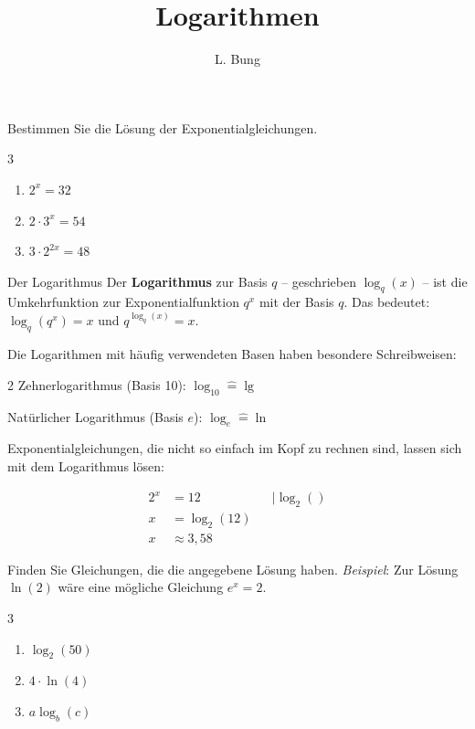 \documentclass[11pt, a4paper, oneside]{article}
\begin{document}
	\author{L. Bung}
	\title{Logarithmen}
	\subject{Mathematik}
	\maketitle
	
	
	Bestimmen Sie die Lösung der Exponentialgleichungen.
	
	\begin{multicols}{3}
		\begin{enumerate}[label=\alph*)]
			\item $2^x=32$
			\item $2\cdot3^x=54$
			\item $3\cdot2^{2x}=48$
		\end{enumerate}
	\end{multicols}
	
	\checkered[6cm]
	
	\begin{hint}{Der Logarithmus}
		Der \textbf{Logarithmus} zur Basis $q$ -- geschrieben $\log_q(x)$ -- ist die Umkehrfunktion zur Exponentialfunktion $q^x$ mit der Basis $q$.
		Das bedeutet: $\log_q(q^x) = x$ und $q^{\log_q(x)}=x$.
		
		\vspace{.5cm}
		Die Logarithmen mit häufig verwendeten Basen haben besondere Schreibweisen:
		\begin{multicols}{2}
			Zehnerlogarithmus (Basis 10): $\log_{10} \widehat{=} \lg$
			
			Natürlicher Logarithmus (Basis $e$): $\log_e \widehat{=} \ln$
		\end{multicols}
		
		Exponentialgleichungen, die nicht so einfach im Kopf zu rechnen sind, lassen sich mit dem Logarithmus lösen:
		
		$$\begin{aligned}
		2^x &= 12 &&|\log_2()\\
		x &= \log_2(12)\\
		x &\approx 3,58
		\end{aligned}$$
	\end{hint}
	
	
	Finden Sie Gleichungen, die die angegebene Lösung haben.
	\emph{Beispiel}: Zur Lösung $\ln(2)$ wäre eine mögliche Gleichung $e^x=2$.
	
	\begin{multicols}{3}
		\begin{enumerate}[label=\alph*)]
			\item $\log_2(50)$
			\item $4 \cdot \ln(4)$
			\item $a \log_b(c)$
		\end{enumerate}
	\end{multicols}
	
\end{document}

